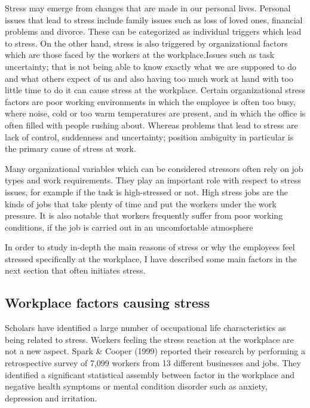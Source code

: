 Stress may emerge from changes that are made in our personal lives.  Personal issues that lead to stress include family issues such as loss of loved ones, financial problems and divorce.  These can be categorized as individual triggers which lead to stress.  On the other hand, stress is also triggered by organizational factors which are those faced by the workers at the workplace.Issues such as task uncertainty; that is not being able to know exactly what we are supposed to do and what others expect of us and also having too much work at hand with too little time to do it can cause stress at the workplace.  Certain organizational stress factors are poor working environments in which the employee is often too busy, where noise, cold or too warm temperatures are present, and in which the office is often filled with people rushing about.  Whereas problems that lead to stress are lack of control, suddenness and uncertainty; position ambiguity in particular is the primary cause of stress at work. \citep[p.350]{Parker2008PersonalityProcess}

Many organizational variables which can be considered stressors often rely on job types and work requirements.  They play an important role with respect to stress issues, for example if the task is high-stressed or not.  High stress jobs are the kinds of jobs that take plenty of time and put the workers under the work pressure. It is also notable that workers frequently suffer from poor working conditions, if the job is carried out in an uncomfortable atmosphere \cite[p.317]{Bloisi2007ManagementBehaviour}

In  order  to  study  in-depth  the  main  reasons  of  stress  or  why  the  employees  feel  stressed specifically at the workplace, I have described some main factors in the next section that often initiates stress.

\subsection{Workplace factors causing stress}

Scholars have identified a large number of occupational life characteristics as being related to stress.  Workers feeling the stress reaction at the workplace are not a new aspect. Spark \& Cooper (1999) reported their research by performing a retrospective survey of 7,099 workers from 13 different businesses and jobs.   They identified a significant statistical assembly between factor in the workplace and negative health symptoms or mental condition disorder such as anxiety, depression and irritation.


